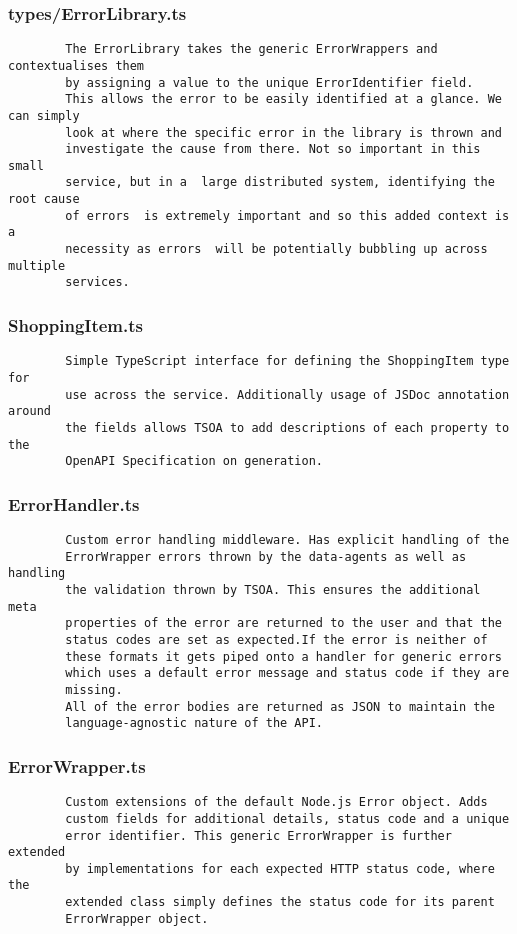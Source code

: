 \subsubsection{types/ErrorLibrary.ts}
\begin{verbatim}
        The ErrorLibrary takes the generic ErrorWrappers and contextualises them
        by assigning a value to the unique ErrorIdentifier field. 
        This allows the error to be easily identified at a glance. We can simply 
        look at where the specific error in the library is thrown and 
        investigate the cause from there. Not so important in this small 
        service, but in a  large distributed system, identifying the root cause
        of errors  is extremely important and so this added context is a 
        necessity as errors  will be potentially bubbling up across multiple 
        services.
\end{verbatim}
\subsubsection{ShoppingItem.ts}

\begin{verbatim}
        Simple TypeScript interface for defining the ShoppingItem type for
        use across the service. Additionally usage of JSDoc annotation around
        the fields allows TSOA to add descriptions of each property to the
        OpenAPI Specification on generation.
\end{verbatim}
\subsubsection{ErrorHandler.ts}
\begin{verbatim}
        Custom error handling middleware. Has explicit handling of the
        ErrorWrapper errors thrown by the data-agents as well as handling
        the validation thrown by TSOA. This ensures the additional meta
        properties of the error are returned to the user and that the 
        status codes are set as expected.If the error is neither of 
        these formats it gets piped onto a handler for generic errors
        which uses a default error message and status code if they are
        missing.
        All of the error bodies are returned as JSON to maintain the
        language-agnostic nature of the API.
\end{verbatim}
\subsubsection{ErrorWrapper.ts}
\begin{verbatim}
        Custom extensions of the default Node.js Error object. Adds
        custom fields for additional details, status code and a unique
        error identifier. This generic ErrorWrapper is further extended
        by implementations for each expected HTTP status code, where the
        extended class simply defines the status code for its parent
        ErrorWrapper object.
\end{verbatim}
